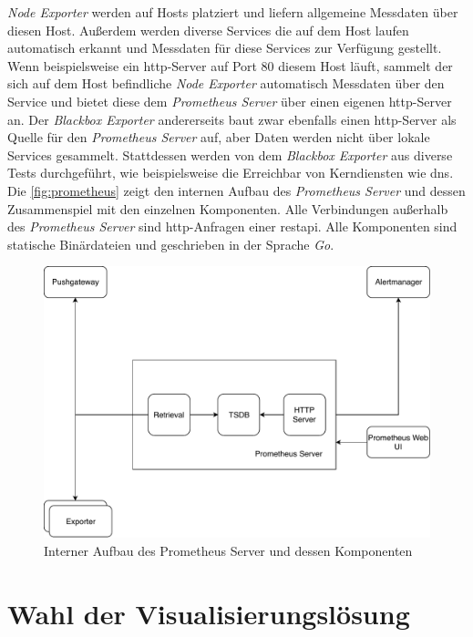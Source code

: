 \documentclass[titlepage]{report}
\begin{document}
\emph{Node Exporter} werden auf Hosts platziert und liefern allgemeine
Messdaten über diesen Host. Außerdem werden diverse Services die auf dem
Host laufen automatisch erkannt und Messdaten für diese Services zur
Verfügung gestellt. Wenn beispielsweise ein \gls{http}\hyp{}Server auf
Port 80 diesem Host läuft, sammelt der sich auf dem Host befindliche \emph{Node
Exporter} automatisch Messdaten über den Service und bietet diese dem
\emph{Prometheus Server} über einen eigenen \gls{http}\hyp{}Server an.
Der \emph{Blackbox Exporter} andererseits baut zwar ebenfalls einen
\gls{http}\hyp{}Server als Quelle für den \emph{Prometheus Server} auf,
aber Daten werden nicht über lokale Services gesammelt. Stattdessen
werden von dem \emph{Blackbox Exporter} aus diverse Tests durchgeführt,
wie beispielsweise die Erreichbar von Kerndiensten wie \gls{dns}.
Die \autoref{fig:prometheus} zeigt den internen Aufbau des
\emph{Prometheus Server} und dessen Zusammenspiel mit den einzelnen
Komponenten. Alle Verbindungen außerhalb des \emph{Prometheus Server}
sind \gls{http}\hyp{}Anfragen einer \gls{restapi}. Alle Komponenten sind
statische Binärdateien und geschrieben in der Sprache \emph{Go}.
\begin{figure}[H]
    \centering
    \includegraphics[width=1.0\textwidth]{figures/prometheus.pdf}
    \caption{Interner Aufbau des Prometheus Server und dessen
    Komponenten}\label{fig:prometheus}
\end{figure}
\section*{Wahl der Visualisierungslösung}
\end{document}

